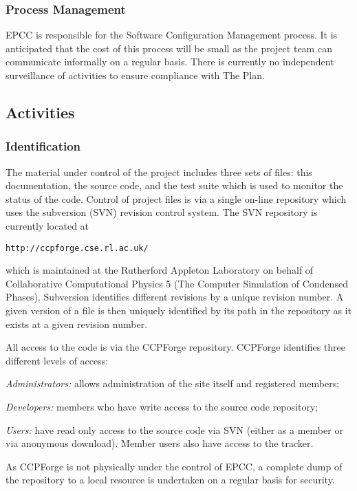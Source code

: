 \subsubsection{Process Management}

EPCC is responsible for the Software Configuration Management process.
It is anticipated that the cost of this process will be small as the
project team can communicate informally on a regular basis. There is
currently no independent
surveillance of activities to ensure compliance with The Plan.

\subsection{Activities}

\subsubsection{Identification}

The material under control of the project includes three sets of files:
this documentation, the source code, and the test suite which is used
to monitor the status of the code.
Control of project files is via a single on-line repository which
uses the subversion (SVN) revision control system. The SVN repository
is currently located at

\texttt{http://ccpforge.cse.rl.ac.uk/}

which is maintained at the Rutherford Appleton Laboratory on behalf
of Collaborative Computational Physics 5 (The Computer Simulation of
Condensed Phases). Subversion identifies different revisions by a
unique revision number. A given version of a file is then uniquely
identified by its path in the repository as it exists at a given
revision number.


All access to the code is via the CCPForge repository. CCPForge identifies
three different levels of access:

\textit{Administrators:} allows administration of the site itself and
registered members;

\textit{Developers:} members who have write access to the source code repository;

\textit{Users:} have read only access to the source code via SVN (either
as a member or via anonymous download). Member users also have access to
the tracker.

As CCPForge is not physically under the control of EPCC, a
complete dump of the repository to a local resource is undertaken on a
regular basis for security.

